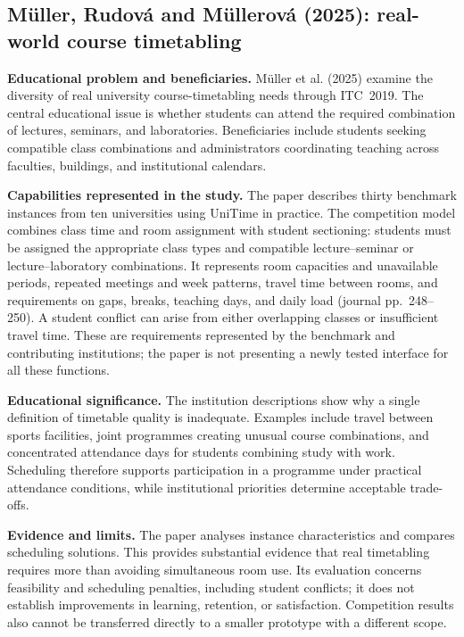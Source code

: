 \documentclass[
  11pt,a4paper,oneside]{report}
\begin{document}
\subsection{Müller, Rudová and Müllerová (2025): real-world course timetabling}
\textbf{Educational problem and beneficiaries.} Müller et al. (2025) examine the diversity of real university course-timetabling needs through ITC~2019. The central educational issue is whether students can attend the required combination of lectures, seminars, and laboratories. Beneficiaries include students seeking compatible class combinations and administrators coordinating teaching across faculties, buildings, and institutional calendars.

\textbf{Capabilities represented in the study.} The paper describes thirty benchmark instances from ten universities using UniTime in practice. The competition model combines class time and room assignment with student sectioning: students must be assigned the appropriate class types and compatible lecture--seminar or lecture--laboratory combinations. It represents room capacities and unavailable periods, repeated meetings and week patterns, travel time between rooms, and requirements on gaps, breaks, teaching days, and daily load (journal pp.~248--250). A student conflict can arise from either overlapping classes or insufficient travel time. These are requirements represented by the benchmark and contributing institutions; the paper is not presenting a newly tested interface for all these functions.

\textbf{Educational significance.} The institution descriptions show why a single definition of timetable quality is inadequate. Examples include travel between sports facilities, joint programmes creating unusual course combinations, and concentrated attendance days for students combining study with work. Scheduling therefore supports participation in a programme under practical attendance conditions, while institutional priorities determine acceptable trade-offs.

\textbf{Evidence and limits.} The paper analyses instance characteristics and compares scheduling solutions. This provides substantial evidence that real timetabling requires more than avoiding simultaneous room use. Its evaluation concerns feasibility and scheduling penalties, including student conflicts; it does not establish improvements in learning, retention, or satisfaction. Competition results also cannot be transferred directly to a smaller prototype with a different scope.
\end{document}
